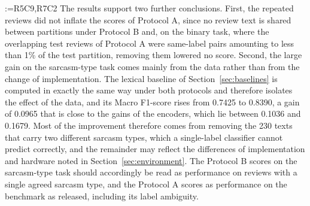 \documentclass[a4paper,fleqn]{cas-sc}
\makeatletter
\newif\iftracked
\newcommand{\rv@setcolour}[1]{%
  \IfStrEq{#1}{R7C7}{\color{rvEdit}}{%
    \IfSubStr{#1}{R5}{\IfSubStr{#1}{R7}{\color{rvBoth}}{\color{rvFive}}}{\color{rvSeven}}}}
\newcommand{\rv@tag}[1]{\textsuperscript{\sffamily\bfseries\scriptsize[\StrSubstitute{#1}{,}{, }]}\,}
\newcommand{\rv@recordone}[1]{%
  \edef\rv@i{#1}%
  \ifcsdef{rv@n@\rv@i}{}{\csgdef{rv@n@\rv@i}{0}}%
  \csxdef{rv@n@\rv@i}{\the\numexpr\csuse{rv@n@\rv@i}+1\relax}%
  \begingroup\edef\@currentlabel{\rv@i}\label{rv:\rv@i:\csuse{rv@n@\rv@i}}\endgroup}
\newcommand{\rv@record}[1]{\@for\rv@id:=#1\do{\expandafter\rv@recordone\expandafter{\rv@id}}}
\newenvironment{rcblock}[1]{\rv@record{#1}\iftracked\rv@setcolour{#1}\leavevmode\rv@tag{#1}\fi\ignorespaces}{\par}
\makeatother
\begin{document}
\begin{rcblock}{R5C9,R7C2}
The results support two further conclusions. First, the repeated reviews did not inflate the scores of Protocol A, since no review text is shared between partitions under Protocol B and, on the binary task, where the overlapping test reviews of Protocol A were same-label pairs amounting to less than 1\% of the test partition, removing them lowered no score. Second, the large gain on the sarcasm-type task comes mainly from the data rather than from the change of implementation. The lexical baseline of Section~\ref{sec:baselines} is computed in exactly the same way under both protocols and therefore isolates the effect of the data, and its Macro F1-score rises from 0.7425 to 0.8390, a gain of 0.0965 that is close to the gains of the encoders, which lie between 0.1036 and 0.1679. Most of the improvement therefore comes from removing the 230 texts that carry two different sarcasm types, which a single-label classifier cannot predict correctly, and the remainder may reflect the differences of implementation and hardware noted in Section~\ref{sec:environment}. The Protocol B scores on the sarcasm-type task should accordingly be read as performance on reviews with a single agreed sarcasm type, and the Protocol A scores as performance on the benchmark as released, including its label ambiguity.
\end{rcblock}
\end{document}
